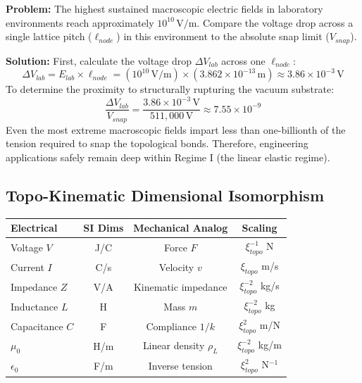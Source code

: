 \begin{examplebox}
\textbf{Problem:} The highest sustained macroscopic electric fields in laboratory environments reach approximately $10^{10}\,\text{V/m}$. Compare the voltage drop across a single lattice pitch ($\ell_{node}$) in this environment to the absolute snap limit ($V_{snap}$).

\textbf{Solution:} 
First, calculate the voltage drop $\Delta V_{lab}$ across one $\ell_{node}$:
\[ \Delta V_{lab} = E_{lab} \times \ell_{node} = (10^{10}\,\text{V/m}) \times (3.862 \times 10^{-13}\,\text{m}) \approx 3.86 \times 10^{-3}\,\text{V} \]
To determine the proximity to structurally rupturing the vacuum substrate:
\[ \frac{\Delta V_{lab}}{V_{snap}} = \frac{3.86 \times 10^{-3}\,\text{V}}{511,000\,\text{V}} \approx 7.55 \times 10^{-9} \]
Even the most extreme macroscopic fields impart less than one-billionth of the tension required to snap the topological bonds. Therefore, engineering applications safely remain deep within Regime I (the linear elastic regime).
\end{examplebox}

\subsection*{Topo-Kinematic Dimensional Isomorphism}
\begin{center}
\small
\renewcommand{\arraystretch}{1.2}
\begin{tabular}{lccc}
\toprule
\textbf{Electrical} & \textbf{SI Dims} & \textbf{Mechanical Analog} & \textbf{Scaling} \\
\midrule
Voltage $V$      & J/C    & Force $F$          & $\xi_{topo}^{-1}$ N \\
Current $I$      & C/s    & Velocity $v$       & $\xi_{topo}$ m/s \\
Impedance $Z$    & V/A    & Kinematic impedance & $\xi_{topo}^{-2}$ kg/s \\
Inductance $L$   & H      & Mass $m$           & $\xi_{topo}^{-2}$ kg \\
Capacitance $C$  & F      & Compliance $1/k$   & $\xi_{topo}^{2}$ m/N \\
$\mu_0$          & H/m    & Linear density $\rho_L$ & $\xi_{topo}^{-2}$ kg/m \\
$\epsilon_0$     & F/m    & Inverse tension     & $\xi_{topo}^{2}$ N$^{-1}$ \\
\bottomrule
\end{tabular}
\end{center}

